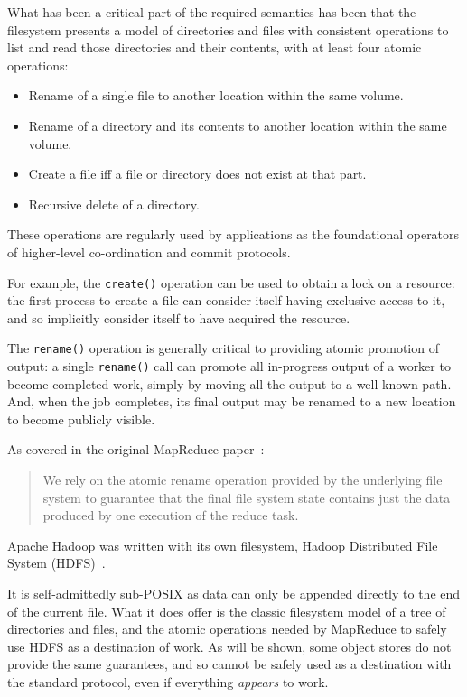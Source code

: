 \documentclass[format=acmsmall, screen=true, nonacm, timestamp, review=false]{acmart}
\begin{document}
What has been a critical part of the required semantics has been that the filesystem
presents a model of directories and files with consistent operations to list and
read those directories and their contents, with at least four atomic operations:

\begin{itemize}
  \item Rename of a single file to another location within the same volume.
  \item Rename of a directory and its contents to another location within the same volume.
  \item Create a file iff a file or directory does not exist at that part.
  \item Recursive delete of a directory.
\end{itemize}

These operations are regularly used by applications as the foundational operators of higher-level
co-ordination and commit protocols.

For example, the \texttt{create()} operation can be used to obtain a lock on a resource:
the first process to create a file can consider itself having exclusive access to it,
and so implicitly consider itself to have acquired the resource.

The \texttt{rename()} operation is generally critical to providing atomic promotion
of output: a single \texttt{rename()} call can promote all in-progress output
of a worker to become completed work, simply by moving all the output to a well known path.
And, when the job completes, its final output may be renamed to a new location to become
publicly visible.

As covered in the original MapReduce paper\ \cite{MapReduce}:

\begin{quote}
We rely on the atomic rename operation provided by the underlying file system
to guarantee that the final file system state contains just the data produced
by one execution of the reduce task.
\end{quote}


Apache Hadoop was written with its own filesystem, Hadoop Distributed File System
(HDFS)\ \cite{Chansler2011}.

It is self-admittedly sub-POSIX as data can only be
appended directly to the end of the current file.
What it does offer is the classic filesystem model of
a tree of directories and files,
and the atomic operations needed by MapReduce to safely use HDFS
as a destination of work.
As will be shown, some object stores do not provide the same guarantees,
and so cannot be safely used as a destination with the standard protocol,
even if everything \emph{appears} to work.
\end{document}

